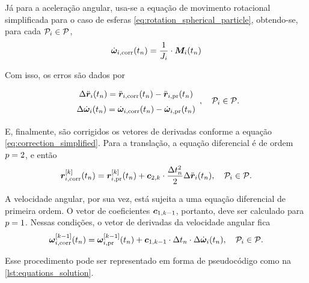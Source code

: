 Já para a aceleração angular, usa-se a equação de movimento rotacional simplificada para o caso de esferas \eqref{eq:rotation_spherical_particle}, obtendo-se, para cada \(\particlei\in\particleSet\),
\begin{equation*}
	\dangularVelocityicorr{1}\pqty{\instant[n]} = \dfrac{1}{\momentOfInertiai}\cdot\resultingTorquei\pqty{\instant[n]}
\end{equation*}

Com isso, os erros são dados por
\begin{equation*}
	\def\arraystretch{1.5}
	\begin{array}{c}
		\Delta \accelerationi\pqty{\instant[n]} = \accelerationicorr\pqty{\instant[n]} - \accelerationipr\pqty{\instant[n]} \\
		\Delta \dangularVelocityi{1}\pqty{\instant[n]} = \dangularVelocityicorr{1}\pqty{\instant[n]} - \dangularVelocityipr{1}\pqty{\instant[n]} \\
	\end{array}, \quad\particlei\in\particleSet.
\end{equation*}

E, finalmente, são corrigidos os vetores de derivadas conforme a equação \eqref{eq:correction_simplified}. Para a translação, a equação diferencial é de ordem \(\eqOrder = 2\), e então
\begin{equation*}
	\drvec{\taylorOrder}{\positionicorr}\pqty{\instant[n]} = \drvecipr{\taylorOrder}{\position}\pqty{\instant[n]} + \correctorConstantVector{\taylorOrder}{2}\cdot\dfrac{\Dt[n]^2}{2}\Delta \accelerationi\pqty{\instant[n]}, \quad\particlei\in\particleSet.
\end{equation*}

A velocidade angular, por sua vez, está sujeita a uma equação diferencial de primeira ordem. O vetor de coeficientes \(\correctorConstantVector{\taylorOrder-1}{1}\), portanto, deve ser calculado para \(\eqOrder=1\). Nessas condições, o vetor de derivadas da velocidade angular fica
\begin{equation*}
		\drvec{\taylorOrder-1}{\angularVelocityicorr}\pqty{\instant[n]} = \drvec{\taylorOrder-1}{\angularVelocityipr}\pqty{\instant[n]} + \correctorConstantVector{\taylorOrder-1}{1}\cdot\Dt[n]\cdot\Delta \dangularVelocityi{1}\pqty{\instant[n]}, \quad\particlei\in\particleSet.
\end{equation*}

Esse procedimento pode ser representado em forma de pseudocódigo como na \cref{lst:equations_solution}.

